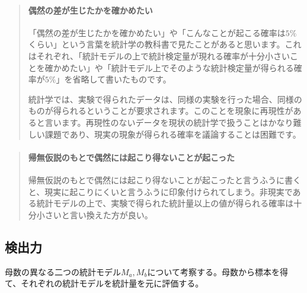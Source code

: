 \documentclass[a4paper,11pt,dvipdfmx]{jsarticle}
\begin{document}
\begin{mybox}
    \begin{quotation}
    \paragraph{偶然の差が生じたかを確かめたい}
    「偶然の差が生じたかを確かめたい」や「こんなことが起こる確率は$5\%$くらい」という言葉を統計学の教科書で見たことがあると思います。これはそれぞれ、「統計モデルの上で統計検定量が現れる確率が十分小さいことを確かめたい」や「統計モデル上でそのような統計検定量が得られる確率が$5\%$」を省略して書いたものです。
    
    統計学では、実験で得られたデータは、同様の実験を行った場合、同様のものが得られるということが要求されます。このことを現象に再現性があると言います。再現性のないデータを現状の統計学で扱うことはかなり難しい課題であり、現実の現象が得られる確率を議論することは困難です。
    \end{quotation}
    \end{mybox}
    
    
    \begin{mybox}
    \begin{quotation}
    \paragraph{帰無仮説のもとで偶然には起こり得ないことが起こった}
    帰無仮説のもとで偶然には起こり得ないことが起こったと言うふうに書くと、現実に起こりにくいと言うふうに印象付けられてしまう。非現実である統計モデルの上で、実験で得られた統計量以上の値が得られる確率は十分小さいと言い換えた方が良い。
    \end{quotation}
    \end{mybox}
    

\subsection{検出力}
母数の異なる二つの統計モデル$M_a,M_b$について考察する。母数から標本を得て、それぞれの統計モデルを統計量を元に評価する。
\end{document}
